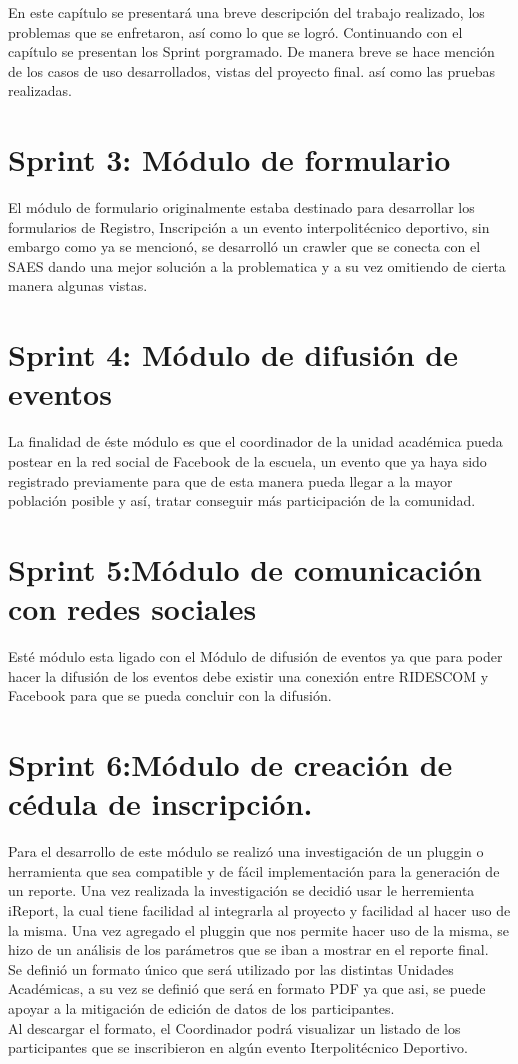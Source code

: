 	\noindent En este capítulo se presentará una breve descripción del trabajo realizado, los problemas que se enfretaron, así como lo que se logró. Continuando con el capítulo se presentan los Sprint porgramado. 
	De manera breve se hace mención de los casos de uso desarrollados, vistas del proyecto final. así como las pruebas realizadas.
	
	\section{Sprint 3: Módulo de formulario}	
	El módulo de formulario originalmente estaba destinado para desarrollar los formularios de Registro, Inscripción a un evento interpolitécnico deportivo, sin embargo como ya se mencionó, se desarrolló un crawler que se conecta con el SAES dando una mejor solución a la problematica y a su vez omitiendo de cierta manera algunas vistas.
	\pagebreak
		
	\section{Sprint 4: Módulo de difusión de eventos}
	La finalidad de éste módulo es que el coordinador de la unidad académica pueda postear en la red social de Facebook de la escuela, un evento que ya haya sido registrado previamente para que de esta manera pueda llegar a la mayor población posible y así, tratar conseguir más participación de la comunidad.
		
		
	\section{Sprint 5:Módulo de comunicación con redes sociales}	
	Esté módulo esta ligado con el Módulo de difusión de eventos ya que para poder hacer la difusión de los eventos debe existir una conexión entre RIDESCOM y Facebook para que se pueda concluir con la difusión.
	
	\section{Sprint 6:Módulo de creación de cédula de inscripción.}
	Para el desarrollo de este módulo se realizó una investigación de un pluggin o herramienta que sea compatible y de fácil implementación para la generación de un reporte. 
	Una vez realizada la investigación se decidió usar le herremienta iReport, la cual tiene facilidad al integrarla al proyecto y facilidad al hacer uso de la misma.
	Una vez agregado el pluggin que nos permite hacer uso de la misma, se hizo de un análisis de los parámetros que se iban a mostrar en el reporte final. \\
	Se definió un formato único que será utilizado por las distintas Unidades Académicas, a su vez se definió que será en formato PDF ya que asi, se puede apoyar a la mitigación de edición de datos de los participantes. \\
	Al descargar el formato, el Coordinador podrá visualizar un listado de los participantes que se inscribieron en algún evento Iterpolitécnico Deportivo.
 
